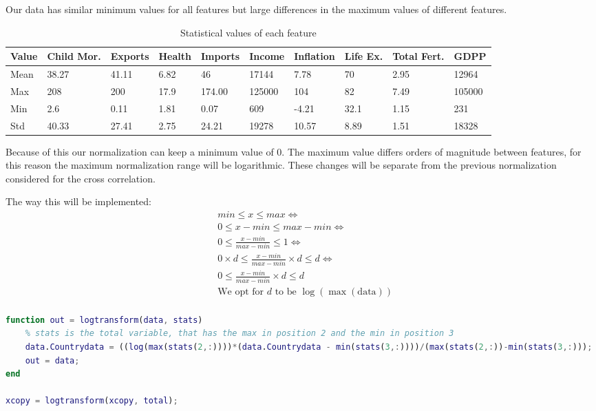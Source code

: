 \documentclass[12pt, a4paper]{article}
\begin{document}
Our data has similar minimum values for all features but large differences in the maximum values of different features.
\begin{table}[H]
    \centering
    \caption{Statistical values of each feature}
    \begin{tabularx}{\textwidth}{lXXXXXXXXX}
        \toprule
        Value & Child Mor. & Exports & Health & Imports & Income & Inflation & Life Ex. & Total Fert. & GDPP \\ 
        \midrule
        Mean & 38.27 & 41.11 & 6.82 & 46 & 17144 & 7.78 & 70 & 2.95 & 12964 \\ 
        Max & 208 & 200 & 17.9 & 174.00 & 125000 & 104 & 82 & 7.49 & 105000 \\ 
        Min & 2.6 & 0.11 & 1.81 & 0.07 & 609 & -4.21 & 32.1 & 1.15 & 231 \\ 
        Std & 40.33 & 27.41 & 2.75 & 24.21 & 19278 & 10.57 & 8.89 & 1.51 & 18328 \\ 
        \bottomrule
    \end{tabularx}
\end{table}
Because of this our normalization can keep a minimum value of $0$. The maximum value differs orders of magnitude between features, for this reason the maximum normalization range will be logarithmic. These changes will be separate from the previous normalization considered for the cross correlation.
\newline

The way this will be implemented:
\begin{equation*}
    \begin{split}
        & min \leq x \leq max \iff \\
        & 0 \leq x-min \leq max - min \iff \\
        & 0 \leq \frac{x-min}{max-min} \leq 1 \iff \\
        & 0 \times d \leq \frac{x-min}{max-min} \times d \leq d \iff \\
        & 0 \leq \frac{x-min}{max-min} \times d \leq d \\
        & \text{We opt for }d \text{ to be } \log(\max(\text{data})) \\ 
    \end{split}
\end{equation*}

\begin{lstlisting}[language=Matlab, label=lst:logtransform, caption=The code that implements the logarithmic transfromation in the range $0$ to $log(max(data))$.]
function out = logtransform(data, stats)
    % stats is the total variable, that has the max in position 2 and the min in position 3
    data.Countrydata = ((log(max(stats(2,:))))*(data.Countrydata - min(stats(3,:))))/(max(stats(2,:))-min(stats(3,:)));
    out = data;
end

xcopy = logtransform(xcopy, total);
\end{lstlisting}
\end{document}
